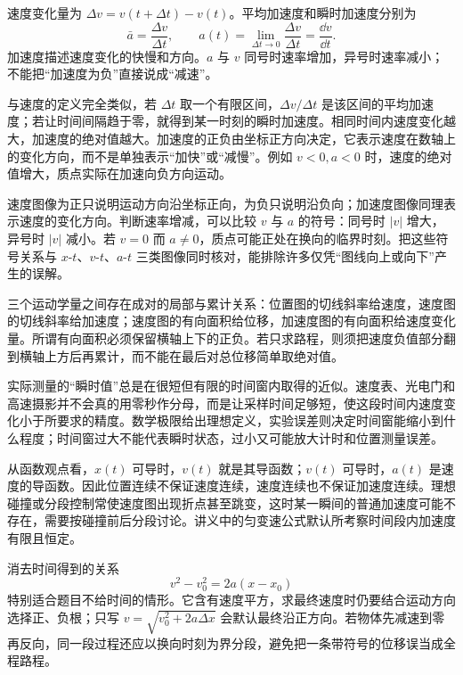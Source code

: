 {速度变化量为 $\Delta v=v(t+\Delta t)-v(t)$。平均加速度和瞬时加速度分别为
\begin{equation}
  \bar a=\frac{\Delta v}{\Delta t},\qquad
  a(t)=\lim_{\Delta t\to0}\frac{\Delta v}{\Delta t}=\frac{\dd v}{\dd t}.
\end{equation}
加速度描述速度变化的快慢和方向。$a$ 与 $v$ 同号时速率增加，异号时速率减小；不能把“加速度为负”直接说成“减速”。

与速度的定义完全类似，若 $\Delta t$ 取一个有限区间，$\Delta v/\Delta t$ 是该区间的平均加速度；若让时间间隔趋于零，就得到某一时刻的瞬时加速度。相同时间内速度变化越大，加速度的绝对值越大。加速度的正负由坐标正方向决定，它表示速度在数轴上的变化方向，而不是单独表示“加快”或“减慢”。例如 $v<0,a<0$ 时，速度的绝对值增大，质点实际在加速向负方向运动。

速度图像为正只说明运动方向沿坐标正向，为负只说明沿负向；加速度图像同理表示速度的变化方向。判断速率增减，可以比较 $v$ 与 $a$ 的符号：同号时 $|v|$ 增大，异号时 $|v|$ 减小。若 $v=0$ 而 $a\ne0$，质点可能正处在换向的临界时刻。把这些符号关系与 $x$-$t$、$v$-$t$、$a$-$t$ 三类图像同时核对，能排除许多仅凭“图线向上或向下”产生的误解。

三个运动学量之间存在成对的局部与累计关系：位置图的切线斜率给速度，速度图的切线斜率给加速度；速度图的有向面积给位移，加速度图的有向面积给速度变化量。所谓有向面积必须保留横轴上下的正负。若只求路程，则须把速度负值部分翻到横轴上方后再累计，而不能在最后对总位移简单取绝对值。

实际测量的“瞬时值”总是在很短但有限的时间窗内取得的近似。速度表、光电门和高速摄影并不会真的用零秒作分母，而是让采样时间足够短，使这段时间内速度变化小于所要求的精度。数学极限给出理想定义，实验误差则决定时间窗能缩小到什么程度；时间窗过大不能代表瞬时状态，过小又可能放大计时和位置测量误差。

从函数观点看，$x(t)$ 可导时，$v(t)$ 就是其导函数；$v(t)$ 可导时，$a(t)$ 是速度的导函数。因此位置连续不保证速度连续，速度连续也不保证加速度连续。理想碰撞或分段控制常使速度图出现折点甚至跳变，这时某一瞬间的普通加速度可能不存在，需要按碰撞前后分段讨论。讲义中的匀变速公式默认所考察时间段内加速度有限且恒定。

消去时间得到的关系
\begin{equation}
 v^2-v_0^2=2a(x-x_0)
\end{equation}
特别适合题目不给时间的情形。它含有速度平方，求最终速度时仍要结合运动方向选择正、负根；只写 $v=\sqrt{v_0^2+2a\Delta x}$ 会默认最终沿正方向。若物体先减速到零再反向，同一段过程还应以换向时刻为界分段，避免把一条带符号的位移误当成全程路程。

}
